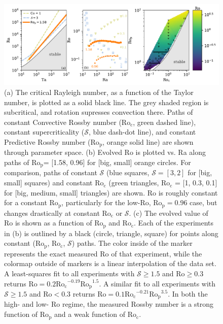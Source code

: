 \documentclass[twocolumn, amsmath, amsfonts, amssymb]{aastex62}
\newcommand{\pro}{\ensuremath{\text{Ro}_{\text{p}}}}
\newcommand{\con}{\ensuremath{\text{Ro}_{\text{c}}}}
\begin{document}
\begin{figure}[t!]
    \includegraphics[width=\textwidth]{parameter_space.pdf}
    \caption{(a) The critical Rayleigh number, as a function of the Taylor number, 
    is plotted as a solid black line. The grey shaded region is subcritical, and rotation
    supresses convection there. Paths of constant Convective Rossby number
    ($\con$, green dashed line), constant supercriticality ($\mathcal{S}$, blue dash-dot line), and 
    constant Predictive Rossby number (\pro, orange solid line) are shown through parameter space. 
    (b) Evolved Ro is plotted vs. Ra along paths of \pro = [1.58, 0.96] for [big, small] orange circles.
    For comparison, paths of constant $\mathcal{S}$ (blue squares, $\mathcal{S} = [3,2]$ 
    for [big, small] squares)
    and constant $\con$ (green triangles, $\con$ = [1, 0.3, 0.1] for [big, medium, small] triangles) are shown.
    Ro is roughly constant for a constant \pro, particularly for the low-Ro, $\pro=0.96$ case, 
    but changes drastically at constant $\con$ or $\mathcal{S}$.
    (c) The evolved value of Ro is shown as a function of $\pro$ and $\con$. 
	Each of the experiments in (b) is outlined by a black (circle, triangle, square)
	for points along constant (\pro, \con, $\mathcal{S}$) paths.
	The color inside of the marker represents the exact measured Ro of that experiment, 
	while the colormap outside of markers is a linear interpolation
	of the data set. A least-squares fit to all experiments with $\mathcal{S} \geq 1.5$ and
	$\text{Ro} \geq 0.3$ returns $\text{Ro} = 0.2 \con^{-0.19}\pro^{1.5}$. A similar fit to all experiments with
	$\mathcal{S} \geq 1.5$ and $\text{Ro} < 0.3$ returns $\text{Ro} = 0.1 \con^{-0.21}\pro^{3.5}$. 
	In both the high- and low- Ro regime, the measured
	Rossby number is a strong function of $\pro$ and a weak function of $\con$.
    \label{fig:parameter_space} }
\end{figure}
\end{document}

